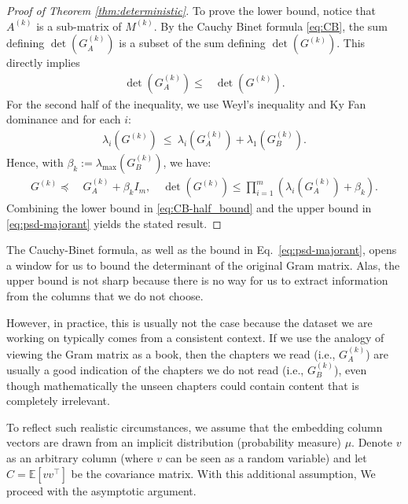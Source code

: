 \documentclass{article}
\theoremstyle{plain}
\theoremstyle{definition}
\theoremstyle{remark}
\begin{document}
\begin{proof}[Proof of Theorem \ref{thm:deterministic}]
To prove the lower bound, notice that $A^{(k)}$ is a sub-matrix of $M^{(k)}$. By the Cauchy Binet formula \eqref{eq:CB}, the sum defining $\det(G_A^{(k)})$ is a subset of the sum defining $\det(G^{(k)})$. This directly implies
\begin{align} \label{eq:CB-half_bound}
    \det(G_A^{(k)}) \leq& \det(G^{(k)}).
\end{align}
For the second half of the inequality, we use Weyl’s inequality and Ky Fan dominance and for each $i$:
\begin{align}
    \lambda_i(G^{(k)})\ \le\ \lambda_i(G_A^{(k)})+\lambda_1(G_B^{(k)}). 
\end{align}
Hence, with $\beta_k:=\lambda_{\max}(G_B^{(k)})$, we have:
\begin{align}
\label{eq:psd-majorant}
    G^{(k)} \preceq&\ G_A^{(k)}+\beta_k I_m,\quad \det(G^{(k)}) \leq \prod_{i=1}^m \left(\lambda_i(G_A^{(k)})+\beta_k\right).
\end{align}
Combining the lower bound in \eqref{eq:CB-half_bound} and the upper bound in \eqref{eq:psd-majorant} yields the stated result.
\end{proof}

The Cauchy-Binet formula, as well as the bound in Eq.~\eqref{eq:psd-majorant}, opens a window for us to bound the determinant of the original Gram matrix. Alas, the upper bound is not sharp because there is no way for us to extract information from the columns that we do not choose.

However, in practice, this is usually not the case because the dataset we are working on typically comes from a consistent context. If we use the analogy of viewing the Gram matrix as a book, then the chapters we read (i.e., $G_A^{(k)}$) are usually a good indication of the chapters we do not read (i.e., $G_B^{(k)}$), even though mathematically the unseen chapters could contain content that is completely irrelevant.

To reflect such realistic circumstances, we assume that the embedding column vectors are drawn from an implicit distribution (probability measure) $\mu$. Denote $v$ as an arbitrary column (where $v$ can be seen as a random variable) and let $C = \mathbb{E}[vv^{\top}]$ be the covariance matrix. With this additional assumption, We proceed with the asymptotic argument.
\end{document}
